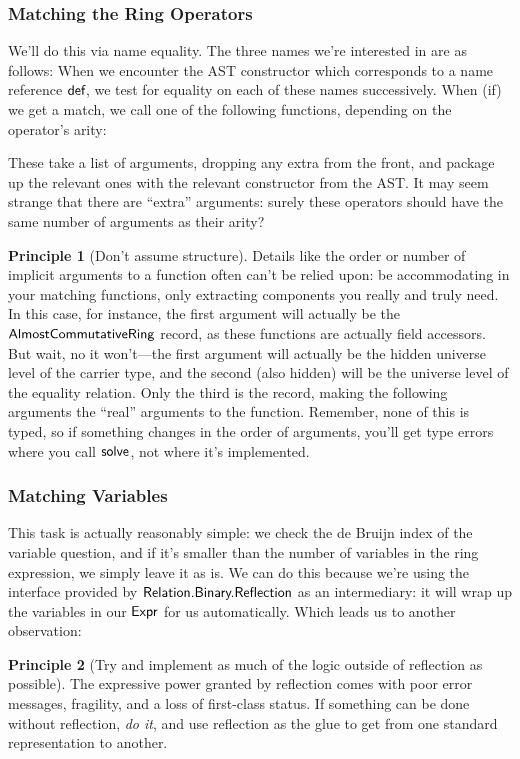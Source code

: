 \documentclass[draft, twocolumn]{article}
\theoremstyle{definition}
\theoremstyle{definition}
\newtheorem{principle}{Principle}[section]
\begin{document}
\subsubsection{Matching the Ring Operators}
We'll do this via name equality. The three names we're interested in are as
follows:
When we encounter the AST constructor which corresponds to a name reference
\(\AgdaInductiveConstructor{def}\), we test for equality on each of these names
successively. When (if) we get a match, we call one of the following functions,
depending on the operator's arity:

These take a list of arguments, dropping any extra from the front, and package
up the relevant ones with the relevant constructor from the AST. It may seem
strange that there are ``extra'' arguments: surely these operators should have
the same number of arguments as their arity?

\begin{principle}[Don't assume structure]
  Details like the order or number of implicit arguments to a function often
  can't be relied upon: be accommodating in your matching functions, only
  extracting components you really and truly need. In this case, for instance,
  the first argument will actually be the
  \(\AgdaDatatype{AlmostCommutativeRing}\) record, as these functions are
  actually field accessors. But wait, no it won't---the first argument will
  actually be the hidden universe level of the carrier type, and the second
  (also hidden) will be the universe level of the equality relation. Only the
  third is the record, making the following arguments the ``real'' arguments to
  the function. Remember, none of this is typed, so if something changes in the
  order of arguments, you'll get type errors where you call
  \(\AgdaMacro{solve}\), not where it's implemented.
\end{principle}
\subsubsection{Matching Variables}
This task is actually reasonably simple: we check the de Bruijn index of the
variable question, and if it's smaller than the number of variables in the ring
expression, we simply leave it as is. We can do this because we're using the
interface provided by \(\AgdaModule{Relation.Binary.Reflection}\) as an
intermediary: it will wrap up the variables in our \(\AgdaDatatype{Expr}\) for
us automatically. Which leads us to another observation:
\begin{principle}[Try and implement as much of the logic outside of reflection
    as possible]
  The expressive power granted by reflection comes with poor error messages,
  fragility, and a loss of first-class status. If something can be done without
  reflection, \emph{do it}, and use reflection as the glue to get from one
  standard representation to another.
\end{principle}
\end{document}
